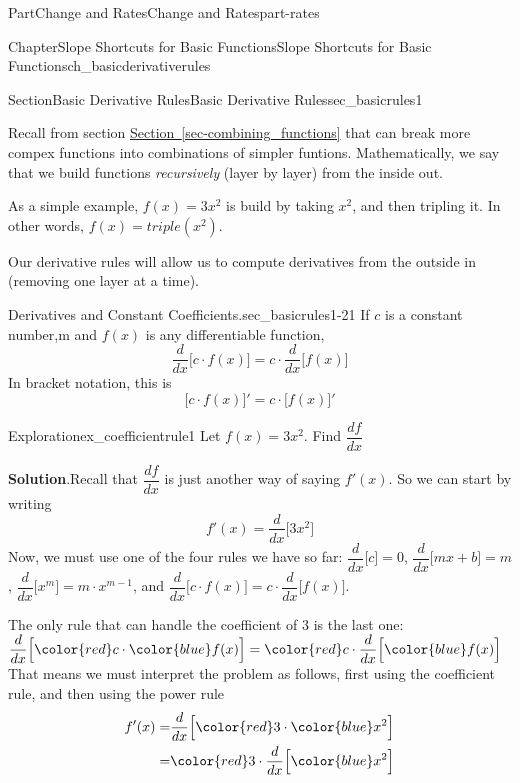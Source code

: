\documentclass{tufte-book}
\newcommand{\blocktitlefont}{\relax}
\newcommand{\xreffont}{\relax}
\numberwithin{equation}{chapter}
\newcommand{\ddx}[1]{ \dfrac{d}{dx} \Big[ #1 \Big]  }
\newcommand{\D}[1]{ \Big[ #1 \Big]'  }
\newcommand{\amp}{&}
\begin{document}
\begin{partptx}{Part}{Change and Rates}{}{Change and Rates}{}{}{part-rates}
\begin{chapterptx}{Chapter}{Slope Shortcuts for Basic Functions}{}{Slope Shortcuts for Basic Functions}{}{}{ch_basicderivativerules}
\begin{sectionptx}{Section}{Basic Derivative Rules}{}{Basic Derivative Rules}{}{}{sec_basicrules1}
\par
Recall from section \hyperref[sec-combining_functions]{Section~{\xreffont\ref{sec-combining_functions}}} that can break more compex functions into combinations of simpler funtions. Mathematically, we say that we build functions \emph{recursively} (layer by layer) from the inside out.%
\par
As a simple example, \(f(x) = 3x^2\) is build by taking \(x^2\), and then tripling it.  In other words, \(f(x) = triple(x^2) \).%
\par
Our derivative rules will allow us to compute derivatives from the outside in (removing one layer at a time).%
\begin{paragraphs}{Derivatives and Constant Coefficients.}{sec_basicrules1-21}%
If \(c\) is a constant number,m and \(f(x)\) is any differentiable function,%
\begin{equation*}
\dfrac{d}{dx}\Big[c\cdot f(x) \Big] = c\cdot \dfrac{d}{dx}\Big[f(x)\Big]
\end{equation*}
In bracket notation, this is%
\begin{equation*}
\D{c \cdot f(x)}  = c\cdot \D{f(x)}
\end{equation*}
%
\end{paragraphs}%
\begin{exploration}{Exploration}{}{ex_coefficientrule1}%
Let \(f(x) = 3x^2\).  Find \(\dfrac{df}{dx}\)%
\par\smallskip%
\noindent\textbf{\blocktitlefont Solution}.\hypertarget{ex_coefficientrule1-2}{}\quad{}Recall that \(\dfrac{df}{dx}\) is just another way of saying \(f'(x)\). So we can start by writing%
\begin{equation*}
f'(x) = \dfrac{d}{dx}\Big[ 3x^2 \Big]
\end{equation*}
Now, we must use one of the four rules we have so far: \(\ddx{c} = 0\), \(\ddx{mx+b} = m\), \(\ddx{x^m} = m\cdot x^{m-1}\), and \(\dfrac{d}{dx}\Big[c\cdot f(x)\Big] = c\cdot \dfrac{d}{dx}\Big[f(x)\Big]\).%
\par
The only rule that can handle the coefficient of \(3\) is the last one: \(\dfrac{d}{dx}\Big[ {\color{red}c}\cdot {\color{blue}f(x)}
\Big]
= 
{\color{red} c}\cdot \dfrac{d}{dx}\Big[\color{blue} f(x)\Big]\) That means we must interpret the problem as follows, first using the coefficient rule, and then using the power rule\textasciigrave{}%
\begin{align*}
f'(x) =  \amp \dfrac{d}{dx}\Big[{\color{red} 3}\cdot {\color{blue}x^2} \Big]\\
= \amp {\color{red} 3}  \cdot \ddx{{\color{blue}x^2} } \\

\end{align*}
\end{exploration}
\end{sectionptx}
\end{chapterptx}
\end{partptx}
\end{document}
